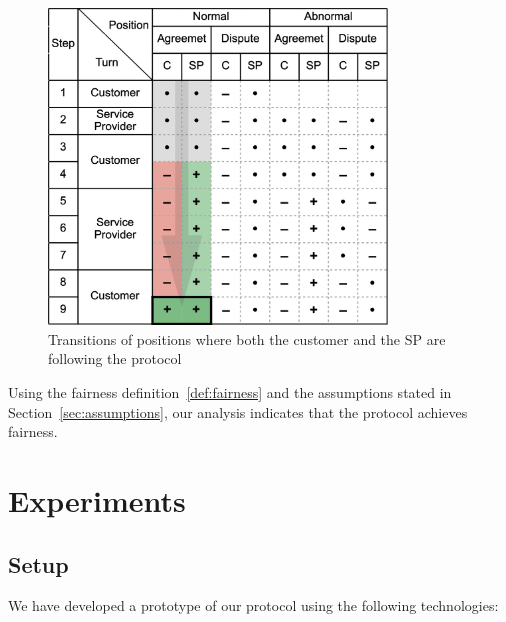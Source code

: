 \begin{figure}[h!]
\includegraphics[width=9cm]{rational.png}
\centering
\caption{Transitions of positions where both the customer and the SP are following the protocol}
\label{fig:rational}
\end{figure}

Using the fairness definition~\ref{def:fairness} and the assumptions stated in Section~\ref{sec:assumptions}, our analysis indicates that the protocol achieves fairness.

\section{Experiments}\label{sec:experiments}

\subsection*{Setup}

We have developed a prototype of our protocol using the following technologies:

